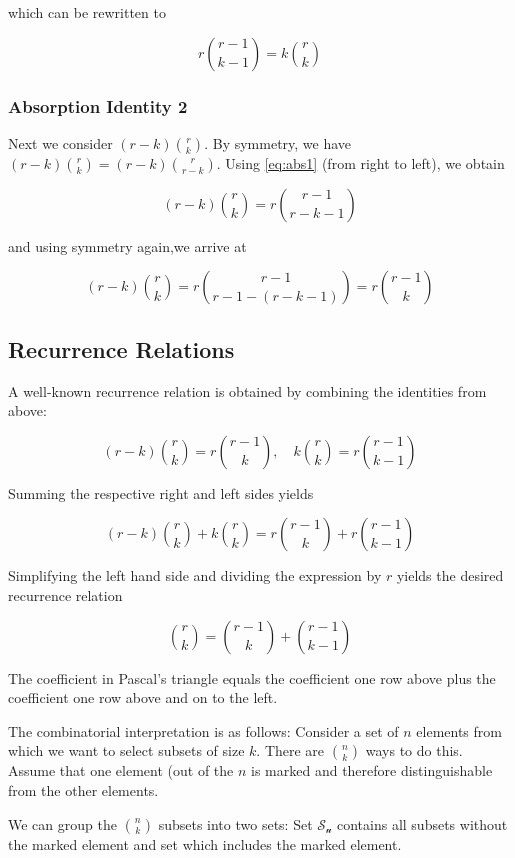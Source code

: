 which can be rewritten to

\begin{equation}
\label{eq:abs1}
r {r-1 \choose k-1} = k {r \choose k}
\end{equation}

\subsubsection{Absorption Identity 2}

Next we consider $(r-k) {r \choose k}$. By symmetry, we have $(r-k) {r \choose k } = (r-k) {r \choose r-k}$. Using \eqref{eq:abs1} (from right to left), we obtain

\[ (r-k) {r \choose k} = r {r-1 \choose r-k-1} \]

and using symmetry again,we arrive at

\[ (r-k) {r \choose k} = r {r-1 \choose r-1-(r-k-1)} = r {r-1 \choose k} \]

\subsection{Recurrence Relations}

A well-known recurrence relation is obtained by combining the identities from above:

\[ (r-k) {r \choose k} =  r {r-1 \choose k}, \quad k {r \choose k} = r {r-1 \choose k-1}\]

Summing the respective right and left sides yields

\[ (r-k) {r \choose k} + k {r \choose k} = r {r-1 \choose k} + r {r-1 \choose k-1}\]

Simplifying the left hand side and dividing the expression by $r$ yields the desired recurrence relation

\begin{equation}
\label{eq:recur}
{r \choose k} = {r-1 \choose k} + {r-1 \choose k-1}
\end{equation}

The coefficient in Pascal's triangle equals the coefficient one row above plus the coefficient one row above and on to the left.

The combinatorial interpretation is as follows: Consider a set of $n$ elements from which we want to select subsets of size $k$. There are ${n \choose k}$ ways to do this. Assume that one element (out of the $n$ is marked and therefore distinguishable from the other elements.

We can group the ${n\choose k}$ subsets into two sets: Set $\mathcal{S_u}$ contains all subsets without the marked element and set which includes the marked element.

